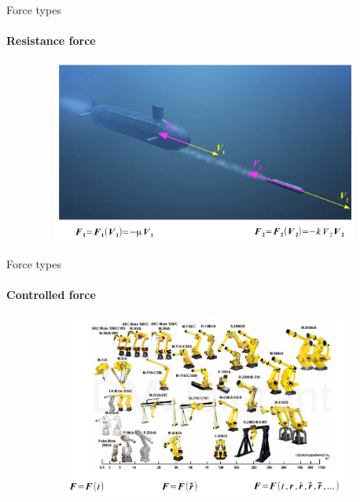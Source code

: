 \documentclass[aspectratio=169]{beamer}
\begin{document}
\begin{frame}[t]{Force types}
    \framesubtitle{Resistance force}
    \vspace*{-0.6cm}
    \begin{center}
        \begin{figure}[H]
            \centering\includegraphics[height=6cm,width=1\textwidth,keepaspectratio]{image23.png}
            \label{fig:image23}
        \end{figure}
    \end{center}
\end{frame}

\begin{frame}[t]{Force types}
    \framesubtitle{Controlled force}
    \vspace*{-0.6cm}
    \begin{center}
        \begin{figure}[H]
            \centering\includegraphics[height=6cm,width=1\textwidth,keepaspectratio]{image22.png}
            \label{fig:image22}
        \end{figure}
    \end{center}
\end{frame}
\end{document}
